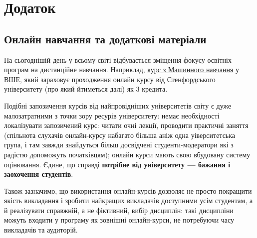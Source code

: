 \documentclass[14pt, a4paper]{extarticle}  %
\begin{document}
\newpage\section{Додаток}

\subsection{Онлайн навчання та додаткові матеріали}
\label{Additional materials}
На сьогоднішій день у всьому світі відбувається зміщення фокусу освітніх програм на дистанційне навчання. Наприклад, \href{https://www.hse.ru/ba/am/courses/219906616.html}{курс з Машинного навчання} у ВШЕ, який зараховує проходження онлайн курсу від Стенфордського університету (про який йтиметься далі) як 3 кредита.

Подібні запозичення курсів від найпровідніших університетів світу є дуже малозатратними з точки зору ресурів університету: немає необхідності локалізувати запозичений курс: читати очні лекції, проводити практичні заняття (спільнота слухачів онлайн-курсу набагато більша аніж одна уіверситетська група, і там завжди знайдуться більш досвідчені студенти-модератори які з радістю допоможуть початківцям); онлайн курси мають свою вбудовану систему оцінювання. Єдине, що справді \textbf{потрібне від університету --- бажання і заохочення студентів}.

Також зазначимо, що використання онлайн-курсів дозволяє не просто покращити якість викладання і зробити найкращих викладачів доступними усім студентам, а й реалізувати справжній, а не фіктивний, вибір дисциплін: такі дисципліни можуть входити у програму як зовнішні онлайн-курси, не потребуючи часу викладачів та аудиторій. 
\end{document}
